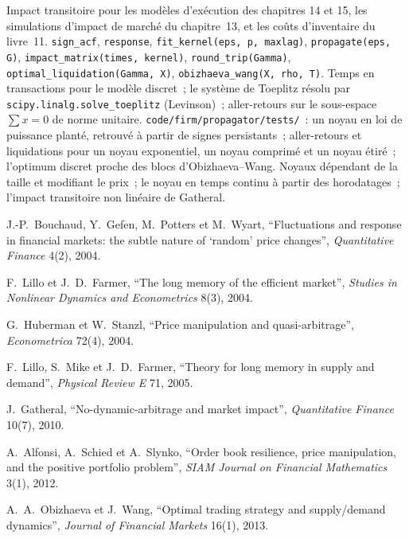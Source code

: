 \begin{build}
 Impact transitoire pour les modèles d'exécution des chapitres 14 et 15, les simulations d'impact de marché du chapitre~13, et les
coûts d'inventaire du livre~11.
 \texttt{sign\_acf}, \texttt{response}, \texttt{fit\_kernel(eps, p, maxlag)}, \texttt{propagate(eps, G)},
\texttt{impact\_matrix(times, kernel)}, \texttt{round\_trip(Gamma)}, \texttt{optimal\_liquidation(Gamma, X)}, \texttt{obizhaeva\_wang(X, rho, T)}.
 Temps en transactions pour le modèle discret~; le système de Toeplitz résolu par \texttt{scipy.linalg.solve\_toeplitz} (Levinson)~; aller-retours sur le
sous-espace $\sum x=0$ de norme unitaire.
 \texttt{code/firm/propagator/tests/}~: un noyau en loi de puissance planté, retrouvé à partir de signes persistants~; aller-retours et liquidations
pour un noyau exponentiel, un noyau comprimé et un noyau étiré~; l'optimum discret proche des blocs d'Obizhaeva--Wang.
 Noyaux dépendant de la taille et modifiant le prix~; le noyau en temps continu à partir des horodatages~; l'impact transitoire non linéaire de Gatheral.
\end{build}

\begin{omsources}
\item J.-P.~Bouchaud, Y.~Gefen, M.~Potters et M.~Wyart, ``Fluctuations and response in financial markets: the subtle nature of `random' price changes'',
\emph{Quantitative Finance} 4(2), 2004.
\item F.~Lillo et J.~D.~Farmer, ``The long memory of the efficient market'', \emph{Studies in Nonlinear Dynamics and Econometrics} 8(3), 2004.
\item G.~Huberman et W.~Stanzl, ``Price manipulation and quasi-arbitrage'', \emph{Econometrica} 72(4), 2004.
\item F.~Lillo, S.~Mike et J.~D.~Farmer, ``Theory for long memory in supply and demand'', \emph{Physical Review E} 71, 2005.
\item J.~Gatheral, ``No-dynamic-arbitrage and market impact'', \emph{Quantitative Finance} 10(7), 2010.
\item A.~Alfonsi, A.~Schied et A.~Slynko, ``Order book resilience, price manipulation, and the positive portfolio problem'', \emph{SIAM Journal on Financial
Mathematics} 3(1), 2012.
\item A.~A.~Obizhaeva et J.~Wang, ``Optimal trading strategy and supply/demand dynamics'', \emph{Journal of Financial Markets} 16(1), 2013.
\end{omsources}

